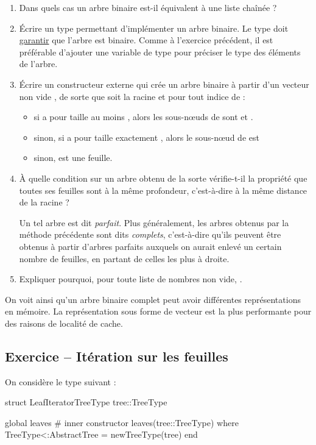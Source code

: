 \documentclass{article}
\newcounter{loop}
\newcounter{numEx}
\newcommand{\exo}[1]{
	\stepcounter{numEx}
	\setcounter{loop}{0}
	\subsection*{Exercice \arabic{numEx} -- #1}
}
\newenvironment{repl}{\vspace{-0.6em}\VerbatimEnvironment\begin{jlrepl}}{\end{jlrepl}}
\begin{document}
\begin{enumerate}
	\item Dans quels cas un arbre binaire est-il équivalent à une liste chaînée ?
	
	\item Écrire un type  permettant d'implémenter un arbre binaire. Le type doit \underline{garantir} que l'arbre est binaire. Comme à l'exercice précédent, il est préférable d'ajouter une variable de type  pour préciser le type des éléments de l'arbre.
	\item Écrire un constructeur externe  qui crée un arbre binaire à partir d'un vecteur non vide , de sorte que  soit la racine et pour tout indice  de :
	\begin{itemize}
		\item si  a pour taille au moins , alors les sous-nœuds de  sont  et .
		\item sinon, si  a pour taille exactement , alors le sous-nœud de  est 
		\item sinon,  est une feuille.
	\end{itemize}
	
	\item À quelle condition sur  un arbre obtenu de la sorte vérifie-t-il la propriété que toutes ses feuilles sont à la même profondeur, c'est-à-dire à la même distance de la racine ? 
	
	Un tel arbre est dit \emph{parfait}. Plus généralement, les arbres obtenus par la méthode précédente sont dits \emph{complets}, c'est-à-dire qu'ils peuvent être obtenus à partir d'arbres parfaits auxquels on aurait enlevé un certain nombre de feuilles, en partant de celles les plus à droite.
	
	\item Expliquer pourquoi, pour toute liste de nombres  non vide, .
\end{enumerate}

On voit ainsi qu'un arbre binaire complet peut avoir différentes représentations en mémoire. La représentation sous forme de vecteur est la plus performante pour des raisons de localité de cache.

\exo{Itération sur les feuilles}

On considère le type suivant :
\begin{repl}
	struct LeafIterator{TreeType}
		tree::TreeType
	
		global leaves  # inner constructor
		leaves(tree::TreeType) where {TreeType<:AbstractTree} = new{TreeType}(tree)
	end
\end{repl}
\end{document}
